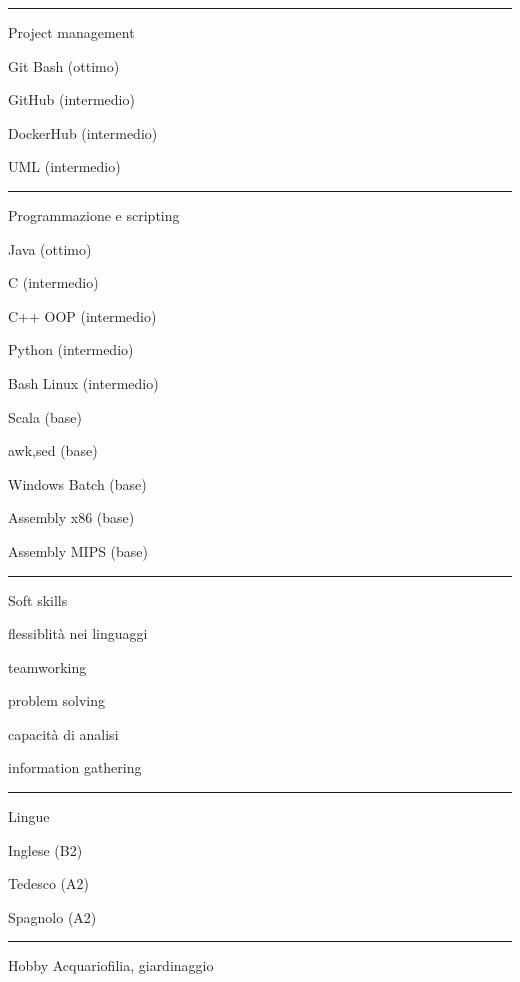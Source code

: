 \documentclass[a4paper]{letter}
\begin{document}
\begin{minipage}[t]{0.30\textwidth}
\setlength{\baselineskip}{1.5\baselineskip}
\color{white}

\vspace{2.1 mm}
\rule{\linewidth}{0.4pt}

{\large Project management}

\faCode \quad Git Bash (ottimo)

\faCode \quad GitHub (intermedio)

\faCode \quad DockerHub (intermedio)

\faCode \quad UML (intermedio)


\rule{\linewidth}{0.4pt}

{\large Programmazione e scripting}

\faCode \quad Java (ottimo)

\faCode \quad C (intermedio)

\faCode \quad C++ OOP (intermedio)

\faCode \quad Python (intermedio)

\faCode \quad Bash Linux (intermedio)

\faCode \quad Scala (base)

\faCode \quad awk,sed (base)

\faCode \quad Windows Batch (base)

\faCode \quad Assembly x86 (base)

\faCode \quad Assembly MIPS (base)

\rule{\linewidth}{0.4pt}

{\large Soft skills}

\faCircleNotch \quad flessiblità nei linguaggi

\faCircleNotch \quad teamworking

\faCircleNotch \quad problem solving

\faCircleNotch \quad capacità di analisi

\faCircleNotch \quad information gathering

\rule{\linewidth}{0.4pt}

{\large Lingue}

\faLanguage \quad Inglese  (B2)

\faLanguage \quad Tedesco  (A2)

\faLanguage \quad Spagnolo (A2)

\rule{\linewidth}{0.4pt}

{\large Hobby}
\newline Acquariofilia, giardinaggio

\end{minipage}
\end{document}
